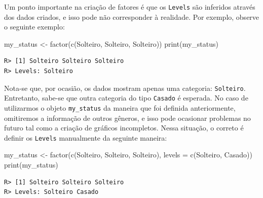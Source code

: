 \documentclass[
  11pt,
]{book}
\newenvironment{Shaded}{\begin{snugshade}}{\end{snugshade}}
\newcommand{\AttributeTok}[1]{\textcolor[rgb]{0.61,0.61,0.61}{#1}}
\newcommand{\FunctionTok}[1]{\textcolor[rgb]{0,0,0}{#1}}
\newcommand{\NormalTok}[1]{#1}
\newcommand{\OtherTok}[1]{\textcolor[rgb]{0.37,0.37,0.37}{#1}}
\newcommand{\StringTok}[1]{\textcolor[rgb]{0.5,0.5,0.5}{#1}}
\begin{document}
Um ponto importante na criação de fatores é que os \texttt{Levels} são inferidos através dos dados criados, e isso pode não corresponder à realidade. Por exemplo, observe o seguinte exemplo:

\begin{Shaded}
\begin{Highlighting}[]
\NormalTok{my\_status }\OtherTok{\textless{}{-}} \FunctionTok{factor}\NormalTok{(}\FunctionTok{c}\NormalTok{(}\StringTok{\textquotesingle{}Solteiro\textquotesingle{}}\NormalTok{, }\StringTok{\textquotesingle{}Solteiro\textquotesingle{}}\NormalTok{, }\StringTok{\textquotesingle{}Solteiro\textquotesingle{}}\NormalTok{))}
\FunctionTok{print}\NormalTok{(my\_status)}
\end{Highlighting}
\end{Shaded}

\begin{verbatim}
R> [1] Solteiro Solteiro Solteiro
R> Levels: Solteiro
\end{verbatim}

Nota-se que, por ocasião, os dados mostram apenas uma categoria: \texttt{Solteiro}. Entretanto, sabe-se que outra categoria do tipo \texttt{Casado} é esperada. No caso de utilizarmos o objeto \texttt{my\_status} da maneira que foi definida anteriormente, omitiremos a informação de outros gêneros, e isso pode ocasionar problemas no futuro tal como a criação de gráficos incompletos. Nessa situação, o correto é definir os \texttt{Levels} manualmente da seguinte maneira:

\begin{Shaded}
\begin{Highlighting}[]
\NormalTok{my\_status }\OtherTok{\textless{}{-}} \FunctionTok{factor}\NormalTok{(}\FunctionTok{c}\NormalTok{(}\StringTok{\textquotesingle{}Solteiro\textquotesingle{}}\NormalTok{, }\StringTok{\textquotesingle{}Solteiro\textquotesingle{}}\NormalTok{, }\StringTok{\textquotesingle{}Solteiro\textquotesingle{}}\NormalTok{),}
                    \AttributeTok{levels =} \FunctionTok{c}\NormalTok{(}\StringTok{\textquotesingle{}Solteiro\textquotesingle{}}\NormalTok{, }\StringTok{\textquotesingle{}Casado\textquotesingle{}}\NormalTok{))}
\FunctionTok{print}\NormalTok{(my\_status)}
\end{Highlighting}
\end{Shaded}

\begin{verbatim}
R> [1] Solteiro Solteiro Solteiro
R> Levels: Solteiro Casado
\end{verbatim}
\end{document}
